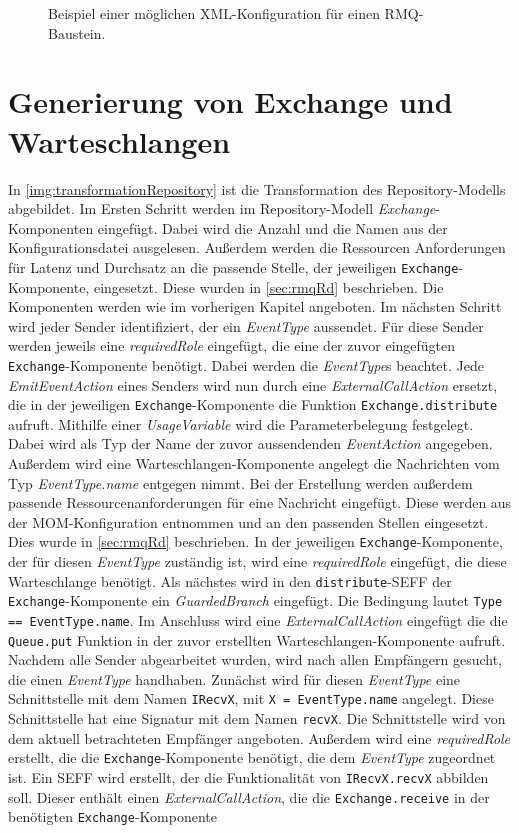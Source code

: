 \begin{figure}
\center
  
  \caption{Beispiel einer möglichen XML-Konfiguration für einen RMQ-Baustein.}
  \label{img:configExample}
\end{figure}

\section{Generierung von Exchange und Warteschlangen}
In \autoref{img:transformationRepository} ist die Transformation des Repository-Modells abgebildet. Im Ersten Schritt werden im Repository-Modell \emph{Exchange}-Komponenten eingefügt. Dabei wird die Anzahl und die Namen aus der Konfigurationsdatei ausgelesen. Außerdem werden die Ressourcen Anforderungen für Latenz und Durchsatz an die passende Stelle, der jeweiligen \texttt{Exchange}-Komponente, eingesetzt. Diese wurden in \autoref{sec:rmqRd} beschrieben. Die Komponenten werden wie im vorherigen Kapitel angeboten. Im nächsten Schritt wird jeder Sender identifiziert, der ein \emph{EventType} aussendet. Für diese Sender werden jeweils eine \emph{requiredRole} eingefügt, die eine der zuvor eingefügten \texttt{Exchange}-Komponente benötigt. Dabei werden die \emph{EventType}s beachtet. Jede \emph{EmitEventAction} eines Senders wird nun durch eine \emph{ExternalCallAction} ersetzt, die in der jeweiligen \texttt{Exchange}-Komponente die Funktion \texttt{Exchange.distribute} aufruft. Mithilfe einer \emph{UsageVariable} wird die Parameterbelegung festgelegt. Dabei wird als Typ der Name der zuvor aussendenden \emph{EventAction} angegeben. Außerdem wird eine Warteschlangen-Komponente angelegt die Nachrichten vom Typ \emph{EventType.name} entgegen nimmt. Bei der Erstellung werden außerdem passende Ressourcenanforderungen für eine Nachricht eingefügt. Diese werden aus der MOM-Konfiguration entnommen und an den passenden Stellen eingesetzt. Dies wurde in \autoref{sec:rmqRd} beschrieben. In der jeweiligen \texttt{Exchange}-Komponente, der für diesen \emph{EventType} zuständig ist, wird eine \emph{requiredRole} eingefügt, die diese Warteschlange benötigt. Als nächstes wird in den \texttt{distribute}-SEFF der \texttt{Exchange}-Komponente ein \emph{GuardedBranch} eingefügt. Die Bedingung lautet \texttt{Type == EventType.name}. Im Anschluss wird eine \emph{ExternalCallAction} eingefügt die die \texttt{Queue.put} Funktion in der zuvor erstellten Warteschlangen-Komponente aufruft. Nachdem alle Sender abgearbeitet wurden, wird nach allen Empfängern gesucht, die einen \emph{EventType} handhaben. Zunächst wird für diesen \emph{EventType} eine Schnittstelle mit dem Namen \texttt{IRecvX}, mit \texttt{X = EventType.name} angelegt. Diese Schnittstelle hat eine Signatur mit dem Namen \texttt{recvX}. Die Schnittstelle wird von dem aktuell betrachteten Empfänger angeboten. Außerdem wird eine \emph{requiredRole} erstellt, die die \texttt{Exchange}-Komponente benötigt, die dem \emph{EventType} zugeordnet ist. Ein SEFF wird erstellt, der die Funktionalität von \texttt{IRecvX.recvX} abbilden soll. Dieser enthält einen \emph{ExternalCallAction}, die die \texttt{Exchange.receive} in der benötigten \texttt{Exchange}-Komponente 